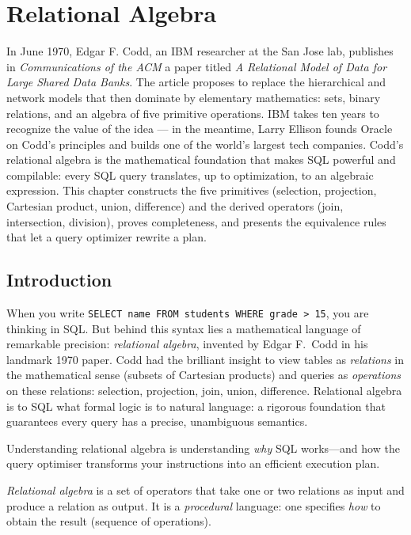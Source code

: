 \chapter{Relational Algebra}
\label{ch:algebra}

In June 1970, Edgar F. Codd, an IBM researcher at the San Jose lab, publishes in \emph{Communications of the ACM} a paper titled \emph{A Relational Model of Data for Large Shared Data Banks}. The article proposes to replace the hierarchical and network models that then dominate by elementary mathematics: sets, binary relations, and an algebra of five primitive operations. IBM takes ten years to recognize the value of the idea --- in the meantime, Larry Ellison founds Oracle on Codd's principles and builds one of the world's largest tech companies. Codd's relational algebra is the mathematical foundation that makes SQL powerful and compilable: every SQL query translates, up to optimization, to an algebraic expression. This chapter constructs the five primitives (selection, projection, Cartesian product, union, difference) and the derived operators (join, intersection, division), proves completeness, and presents the equivalence rules that let a query optimizer rewrite a plan.

\section{Introduction}

When you write \texttt{SELECT name FROM students WHERE grade > 15}, you are thinking in SQL. But behind this syntax lies a mathematical language of remarkable precision: \emph{relational algebra}, invented by Edgar F.\ Codd in his landmark 1970 paper. Codd had the brilliant insight to view tables as \emph{relations} in the mathematical sense (subsets of Cartesian products) and queries as \emph{operations} on these relations: selection, projection, join, union, difference. Relational algebra is to SQL what formal logic is to natural language: a rigorous foundation that guarantees every query has a precise, unambiguous semantics.

Understanding relational algebra is understanding \emph{why} SQL works---and how the query optimiser transforms your instructions into an efficient execution plan.

\begin{definition}
\emph{Relational algebra} is a set of operators that take one or two relations
as input and produce a relation as output. It is a \emph{procedural} language:
one specifies \emph{how} to obtain the result (sequence of operations).
\end{definition}

